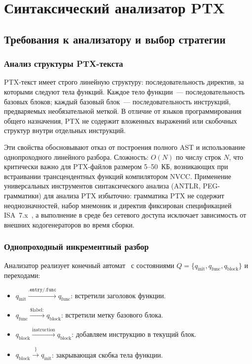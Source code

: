 \section{Синтаксический анализатор PTX}

\subsection{Требования к анализатору и выбор стратегии}

\subsubsection{Анализ структуры PTX-текста}

PTX-текст имеет строго линейную структуру: последовательность директив,
за которыми следуют тела функций. Каждое тело функции~--- последовательность
базовых блоков; каждый базовый блок~--- последовательность инструкций,
предваряемых необязательной меткой. В отличие от языков программирования
общего назначения, PTX не содержит вложенных выражений или скобочных
структур внутри отдельных инструкций.

Эти свойства обосновывают отказ от построения полного AST и использование
однопроходного линейного разбора. Сложность: $O(N)$ по числу строк $N$,
что критически важно для PTX-файлов размером 5--50~КБ, возникающих
при встраивании трансцендентных функций компилятором NVCC.
Применение универсальных инструментов синтаксического анализа (ANTLR, PEG-грамматики)
для анализа PTX избыточно: грамматика PTX не содержит неоднозначностей,
набор мнемоник и директив фиксирован спецификацией ISA~7.x~\cite{PTXISA}, а выполнение
в среде без сетевого доступа исключает зависимость от внешних кодогенераторов
во время сборки.

\subsubsection{Однопроходный инкрементный разбор}

Анализатор реализует конечный автомат~\cite{Martynenko2004}
с состояниями $Q = \{q_{\mathrm{init}}, q_{\mathrm{func}}, q_{\mathrm{block}}\}$
и переходами:
\begin{itemize}
  \item $q_{\mathrm{init}} \xrightarrow{\texttt{.entry/.func}} q_{\mathrm{func}}$:
        встретили заголовок функции.
  \item $q_{\mathrm{func}} \xrightarrow{\$\mathrm{label}:} q_{\mathrm{block}}$:
        встретили метку базового блока.
  \item $q_{\mathrm{block}} \xrightarrow{\mathrm{instruction}} q_{\mathrm{block}}$:
        добавляем инструкцию в текущий блок.
  \item $q_{\mathrm{block}} \xrightarrow{\}} q_{\mathrm{init}}$:
        закрывающая скобка тела функции.
\end{itemize}

